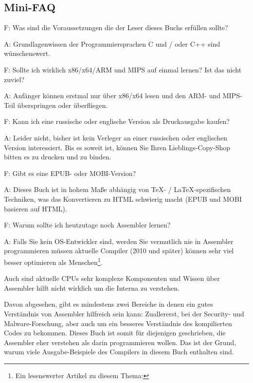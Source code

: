 \subsection*{Mini-FAQ}


\par F: Was sind die Voraussetzungen die der Leser dieses Buchs erfüllen sollte?
\par A: Grundlagenwissen der Programmiersprachen C und / oder C++ sind wünschenswert.

\par F: Sollte ich wirklich x86/x64/ARM und MIPS auf einmal lernen? Ist das nicht zuviel?
\par A: Anfänger können erstmal nur über x86/x64 lesen und den ARM- und MIPS-Teil überspringen oder überfliegen.

\par F: Kann ich eine russische oder englische Version als Druckausgabe kaufen?
\par A: Leider nicht, bisher ist kein Verleger an einer russischen oder englischen Version interessiert.
Bis es soweit ist, können Sie Ihren Lieblings-Copy-Shop bitten es zu drucken und zu binden.

\par F: Gibt es eine EPUB- oder MOBI-Version?
\par A: Dieses Buch ist in hohem Maße abhängig von \TeX{}- / \LaTeX{}-spezifischen Techniken,
was das Konvertieren zu HTML schwierig macht (EPUB und MOBI basieren auf HTML).

\par F: Warum sollte ich heutzutage noch Assembler lernen?
\par A: Falls Sie kein \ac{OS}-Entwickler sind, werden Sie vermutlich nie in Assembler programmieren müssen \textemdash{}
aktuelle Compiler (2010 und später) können sehr viel besser optimieren als Menschen\footnote{Ein lesenswerter Artikel zu diesem Thema: \InSqBrackets{\AgnerFog}}.

Auch sind aktuelle \ac{CPU}s sehr komplexe Komponenten und Wissen über Assembler hilft nicht wirklich
um die Interna zu verstehen.

Davon abgesehen, gibt es mindestens zwei Bereiche in denen ein gutes Verständnis von Assembler hilfreich
sein kann: Zuallererst, bei der Security- und Malware-Forschung, aber auch um ein besseres Verständnis des kompilierten
Codes zu bekommen.
Dieses Buch ist somit für diejenigen geschrieben, die Assembler eher verstehen als darin programmieren wollen.
Das ist der Grund, warum viele Ausgabe-Beispiele des Compilers in diesem Buch enthalten sind.

